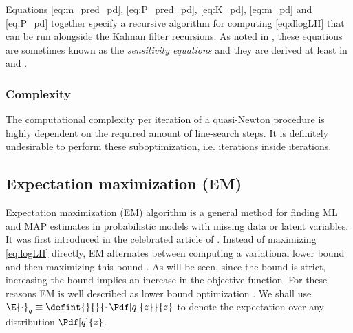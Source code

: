 Equations \eqref{eq:m_pred_pd}, \eqref{eq:P_pred_pd}, \eqref{eq:K_pd}, \eqref{eq:m_pd} and \eqref{eq:P_pd} together specify
a recursive algorithm for computing \eqref{eq:dlogLH} that can be run alongside the Kalman filter recursions.
As noted in \textcite{Cappe2005}, these equations are sometimes known as the \emph{sensitivity equations}
and they are derived at least in \textcite{Gupta1974} and \textcite{Mbalawataa}.

\subsubsection{Complexity}

The computational complexity per iteration of a quasi-Newton procedure is
highly dependent on the required amount of line-search steps. It is definitely
undesirable to perform these suboptimization, i.e. iterations inside iterations.

\subsection{Expectation maximization (EM)}%

Expectation maximization (EM) algorithm is a general
method for finding ML and MAP estimates in probabilistic models with missing data or
latent variables. It was first introduced in
the celebrated article of \textcite{Dempster1977}. Instead of maximizing
\eqref{eq:logLH} directly, EM alternates between computing a variational lower bound and then maximizing this bound
\parencite{Bishop2006,barber2012bayesian}. As will be seen, since the bound is strict, increasing the bound implies
an increase in the objective function. For these reasons EM is well described as lower bound optimization \parencite{Minka1998}.
We shall use $\E{\cdot}_{q}\equiv\defint{}{}{\cdot\,\Pdf[q]{z}}{z}$ to denote the expectation
over any distribution $\Pdf[q]{z}$.

